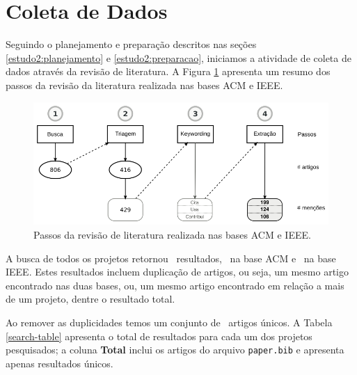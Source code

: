 
\section{Coleta de Dados} \label{estudo2:coleta} %

Seguindo o planejamento e preparação descritos nas seções
\ref{estudo2:planejamento} e \ref{estudo2:preparacao}, iniciamos a atividade de coleta de
dados através da revisão de literatura.
A Figura \ref{estudo2-revisao-literatura} apresenta um resumo dos passos da revisão da literatura
realizada nas bases ACM e IEEE.

\begin{figure}[h]
  \center
  \includegraphics[scale=0.35]{imagens/estudo2-revisao-literatura.png}
  \caption{Passos da revisão de literatura realizada nas bases ACM e IEEE.}
  \label{estudo2-revisao-literatura}
\end{figure}



A busca de todos os projetos retornou \SearchCount \ resultados,
\SearchACMCount \ na base ACM e \SearchIEEECount \ na base IEEE.
Estes resultados incluem duplicação de artigos, ou seja,
um mesmo artigo encontrado nas duas bases, ou, um mesmo artigo
encontrado em relação a mais de um projeto, dentre o resultado total.

Ao remover as duplicidades temos um conjunto de \SearchUniqueCount \ artigos
únicos.  A Tabela \ref{search-table} apresenta o total de resultados para cada
um dos projetos pesquisados; a coluna {\bf Total} inclui os artigos do arquivo
\texttt{paper.bib} e apresenta apenas resultados únicos.




